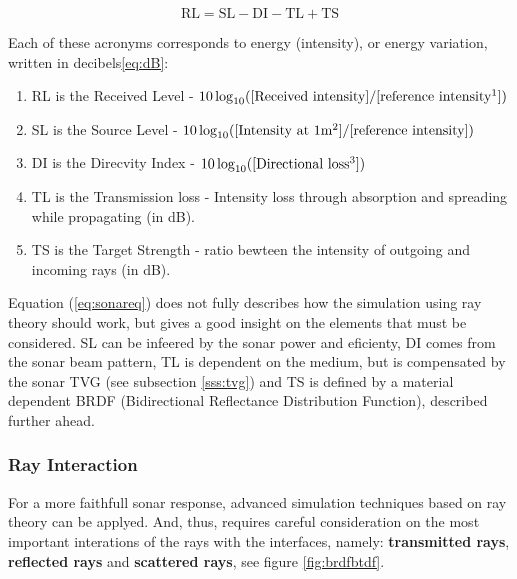 \begin{equation}
\label{eq:sonareq}
\text{RL} = \text{SL} - \text{DI} - \text{TL} + \text{TS}
\end{equation}

Each of these acronyms corresponds to energy (intensity), or energy variation,
written in decibels\ref{eq:dB}:
\begin{enumerate}
  \item RL is the Received Level - $10\log_{10}([\text{Received
  intensity}]/[\text{reference intensity\footnotemark}])$
  \item SL is the Source Level - $10\log_{10}([\text{Intensity at
  1m\footnotemark}]/[\text{reference
  intensity}])$
  \item DI is the Direcvity Index - $10\log_{10}([\text{Directional
  loss\footnotemark}])$
  \item TL is the Transmission loss - Intensity loss through absorption and
  spreading while propagating (in dB).
  \item TS is the Target Strength - ratio bewteen the intensity of outgoing
  and incoming rays (in dB).
\end{enumerate}



Equation (\ref{eq:sonareq}) does not fully describes how the simulation
using ray theory should work, but gives a good insight on the elements that must
be considered. SL can be infeered by the sonar power and eficienty, DI comes
from the sonar beam pattern, TL is dependent on the medium, but is compensated
by the sonar TVG (see subsection \ref{sss:tvg}) and TS is defined by a material
dependent BRDF (Bidirectional Reflectance Distribution Function), described further ahead.

\subsubsection{Ray Interaction}

For a more faithfull sonar response, advanced simulation techniques based on ray
theory can be applyed. And, thus, requires careful consideration on the most
important interations of the rays with the interfaces, namely:
\textbf{transmitted rays}, \textbf{reflected rays}  and \textbf{scattered rays},
see figure \ref{fig:brdfbtdf}.

